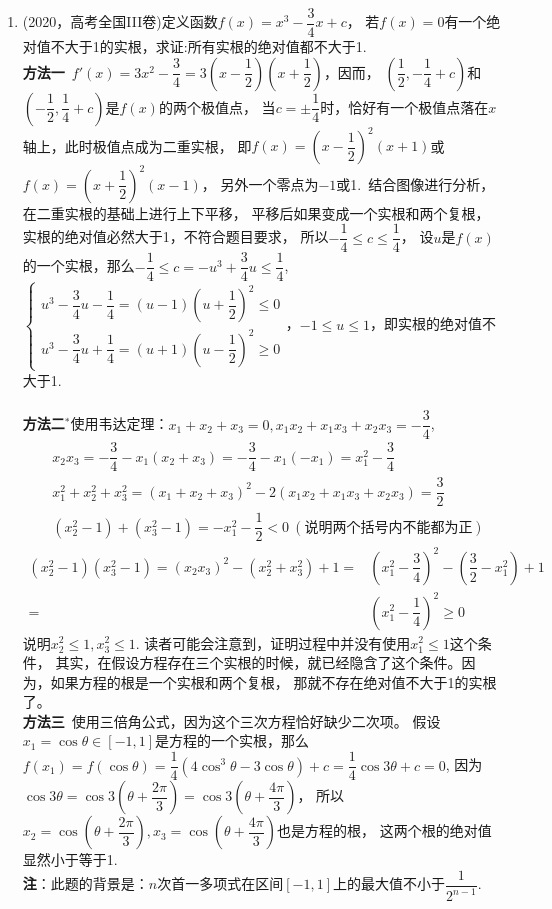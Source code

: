 \begin{enumerate}[label={【\textbf{例\thechapter.\arabic*}】},
 leftmargin=\inteval{\myenumleftmargin}pt,
 itemsep=\inteval{\myenumitempsep}pt,
 itemindent=\inteval{\myenumitemindent}pt]
\item (2020，高考全国III卷)定义函数$ f(x)=x^3-\dfrac{3}{4}x+c $，
若$ f(x)=0 $有一个绝对值不大于1的实根，求证:所有实根的绝对值都不大于1.\\
\textbf{方法一}\ $ f'(x)=3x^2-\dfrac{3}{4}=3(x-\dfrac{1}{2})(x+\dfrac{1}{2}) $，因而，
$ (\dfrac{1}{2},-\dfrac{1}{4}+c) $和$ (-\dfrac{1}{2},\dfrac{1}{4}+c) $是$ f(x) $的两个极值点，
当$ c=\pm \dfrac{1}{4} $时，恰好有一个极值点落在$ x $轴上，此时极值点成为二重实根，
即$ f(x)=\left(x-\dfrac{1}{2} \right)^2(x+1)  $或$ f(x)=\left(x+\dfrac{1}{2} \right)^2(x-1)  $，
另外一个零点为$ -1 $或1.\ 结合图像进行分析，在二重实根的基础上进行上下平移，
平移后如果变成一个实根和两个复根，实根的绝对值必然大于1，不符合题目要求，
所以$ -\dfrac{1}{4}\leq c \leq \dfrac{1}{4} $，%
设$ u $是$ f(x) $的一个实根，那么$ -\dfrac{1}{4}\leq c=-u^3+\dfrac{3}{4}u \leq \dfrac{1}{4} $, 
$ \left\{ 
\begin{aligned}
    u^3-\dfrac{3}{4}u-\dfrac{1}{4}=(u-1)(u+\dfrac{1}{2})^2 \leq 0 \\
    u^3-\dfrac{3}{4}u+\dfrac{1}{4}=(u+1)(u-\dfrac{1}{2})^2 \geq 0 
\end{aligned}
\right.  $，$ -1 \leq u \leq 1 $，即实根的绝对值不大于1.\\
\\
\textbf{方法二}$ ^* $使用韦达定理：$ x_1+x_2+x_3=0,x_1x_2+x_1x_3+x_2x_3=-\dfrac{3}{4} $,
\begin{align*}
    &  x_2x_3=-\dfrac{3}{4}-x_1(x_2+x_3)=-\dfrac{3}{4}-x_1(-x_1)=x_1^2-\dfrac{3}{4}  \\
    & x_1^2+x_2^2+x_3^2=(x_1+x_2+x_3)^2-2(x_1x_2+x_1x_3+x_2x_3) =\dfrac{3}{2}  \\
    & (x_2^2-1)+(x_3^2-1)=-x_1^2-\dfrac{1}{2} < 0\ (\text{说明两个括号内不能都为正})
\end{align*}
\vspace{-0.7cm}
\begin{align*}
    (x_2^2-1)(x_3^2-1)=(x_2x_3)^2-(x_2^2+x_3^2)+1 = &
    \left( x_1^2-\dfrac{3}{4} \right)^2-\left( \dfrac{3}{2}-x_1^2\right)  +1\\
    = & \left( x_1^2-\dfrac{1}{4}\right) ^2 \geq 0
\end{align*}
说明$ x_2^2\leq 1,x_3^2\leq 1 $. 读者可能会注意到，证明过程中并没有使用$ x_1^2\leq 1 $这个条件，
其实，在假设方程存在三个实根的时候，就已经隐含了这个条件。因为，如果方程的根是一个实根和两个复根，
那就不存在绝对值不大于1的实根了。\\
\textbf{方法三}\ 使用三倍角公式，因为这个三次方程恰好缺少二次项。
假设$ x_1=\cos \theta \in [-1,1] $是方程的一个实根，那么$ f(x_1)
=f(\cos \theta)=\dfrac{1}{4}(4\cos^3 \theta-3\cos \theta)+c=\dfrac{1}{4}\cos3\theta + c=0 $,
因为$ \cos3\theta=\cos3(\theta+\dfrac{2\pi}{3})=\cos3(\theta+\dfrac{4\pi}{3}) $，
所以$ x_2=\cos(\theta+\dfrac{2\pi}{3}),x_3=\cos(\theta+\dfrac{4\pi}{3}) $也是方程的根，
这两个根的绝对值显然小于等于1.  \\
\textbf{注}：此题的背景是：$ n $次首一多项式在区间$ [-1,1] $上的最大值不小于$ \dfrac{1}{2^{n-1}} $.


\end{enumerate}
